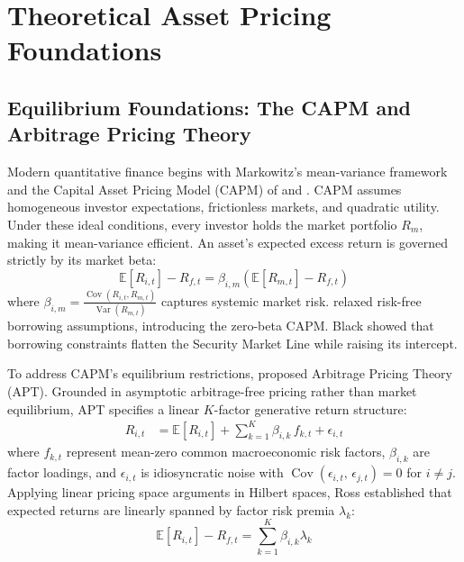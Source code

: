 \section{Theoretical Asset Pricing Foundations}

\subsection{Equilibrium Foundations: The CAPM and Arbitrage Pricing Theory}
Modern quantitative finance begins with Markowitz's \citeyearpar{markowitz1952portfolio} mean-variance framework and the Capital Asset Pricing Model (CAPM) of \citet{sharpe1964capital} and \citet{lintner1965valuation}. CAPM assumes homogeneous investor expectations, frictionless markets, and quadratic utility. Under these ideal conditions, every investor holds the market portfolio $R_m$, making it mean-variance efficient. An asset's expected excess return is governed strictly by its market beta:
\begin{equation}
\mathbb{E}[R_{i,t}] - R_{f,t} = \beta_{i,m} \left( \mathbb{E}[R_{m,t}] - R_{f,t} \right)
\label{eq:ch2_capm}
\end{equation}
where $\beta_{i,m} = \frac{\operatorname{Cov}(R_{i,t}, R_{m,t})}{\operatorname{Var}(R_{m,t})}$ captures systemic market risk. \citet{black1972capital} relaxed risk-free borrowing assumptions, introducing the zero-beta CAPM. Black showed that borrowing constraints flatten the Security Market Line while raising its intercept.

To address CAPM's equilibrium restrictions, \citet{ross1976arbitrage} proposed Arbitrage Pricing Theory (APT). Grounded in asymptotic arbitrage-free pricing rather than market equilibrium, APT specifies a linear $K$-factor generative return structure:
\begin{align}
\label{eq:ch2_apt}
R_{i,t} &= \mathbb{E}[R_{i,t}] + \sum_{k=1}^{K} \beta_{i,k}\, f_{k,t} + \epsilon_{i,t}
\end{align}
where $f_{k,t}$ represent mean-zero common macroeconomic risk factors, $\beta_{i,k}$ are factor loadings, and $\epsilon_{i,t}$ is idiosyncratic noise with $\operatorname{Cov}(\epsilon_{i,t},\,\epsilon_{j,t})=0$ for $i \neq j$. Applying linear pricing space arguments in Hilbert spaces, Ross established that expected returns are linearly spanned by factor risk premia $\lambda_k$:
\begin{equation}
\mathbb{E}[R_{i,t}] - R_{f,t} = \sum_{k=1}^{K} \beta_{i,k} \lambda_k
\label{eq:ch2_apt_premia}
\end{equation}


